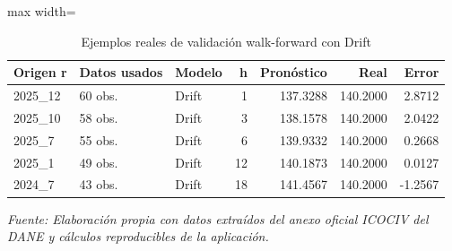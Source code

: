 \begin{table}[H]
\centering
\caption{Ejemplos reales de validación walk-forward con Drift}
\label{tab:ejemplo_walkforward_vias_urbanas}
\scriptsize
\begin{adjustbox}{max width=\linewidth}
\begin{tabular}{lllrrrr}
\toprule
Origen r & Datos usados & Modelo & h & Pronóstico & Real & Error \\
\midrule
2025\_12 & 60 obs. & Drift & 1 & 137.3288 & 140.2000 & 2.8712 \\
2025\_10 & 58 obs. & Drift & 3 & 138.1578 & 140.2000 & 2.0422 \\
2025\_7 & 55 obs. & Drift & 6 & 139.9332 & 140.2000 & 0.2668 \\
2025\_1 & 49 obs. & Drift & 12 & 140.1873 & 140.2000 & 0.0127 \\
2024\_7 & 43 obs. & Drift & 18 & 141.4567 & 140.2000 & -1.2567 \\
\bottomrule
\end{tabular}
\end{adjustbox}
\par\footnotesize\textit{Fuente: Elaboración propia con datos extraídos del anexo oficial ICOCIV del DANE y cálculos reproducibles de la aplicación.}
\end{table}
